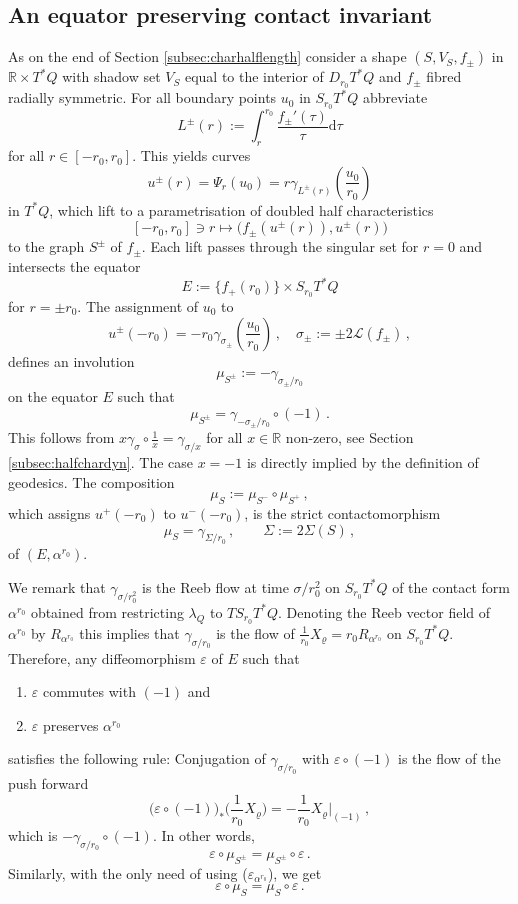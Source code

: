 \documentclass{amsart}
\theoremstyle{definition}
\newcommand{\rmd}{\mathrm d}
\newcommand{\LLL}{\mathscr L}
\newcommand{\R}{\mathbb R}
\begin{document}

\subsection{An equator preserving contact invariant\label{subsec:equatorpresvinv}}



As on the end of Section \ref{subsec:charhalflength}
consider a shape $(S,V_S,f_{\pm})$ in $\R\times T^*Q$
with shadow set $V_S$
equal to the interior of $D_{r_0}T^*Q$
and $f_{\pm}$ fibred radially symmetric.
For all boundary points $u_0$ in $S_{r_0}T^*Q$
abbreviate
\[
L^{\pm}(r):=
\int_r^{r_0}
          \frac{f_{\pm}'(\tau)}{\tau}
\rmd\tau
\]
for all $r\in[-r_0,r_0]$.
This yields curves
\[
u^{\pm}(r)=
\Psi_r(u_0)=
r\gamma_{L^{\pm}(r)}
\left(\frac{u_0}{r_0}\right)
\]
in $T^*Q$,
which lift to a parametrisation of
doubled half characteristics
\[
[-r_0,r_0]\ni r\longmapsto
\big(f_{\pm}(u^{\pm}(r)),u^{\pm}(r)\big)
\]
to the graph $S^{\pm}$ of $f_{\pm}$.
Each lift passes through the singular set for $r=0$
and intersects the equator
\[
E:=\{f_+(r_0)\}\times S_{r_0}T^*Q
\]
for $r=\pm r_0$.
The assignment of $u_0$ to
\[
u^{\pm}(-r_0)=
-r_0\gamma_{\sigma_{\pm}}
\!\left(\frac{u_0}{r_0}\right)
\,,
\quad
\sigma_{\pm}:={\pm}2\LLL(f_{\pm})
\,,
\]
defines an involution
\[
\mu_{S^{\pm}}:=
-\gamma_{\sigma_{\pm}/r_0}
\]
on the equator $E$ such that
\[
\mu_{S^{\pm}}=
\gamma_{-\sigma_{\pm}/r_0}\circ (-1)
\,.
\]
This follows from
$x\gamma_{\sigma}\circ\frac1x=\gamma_{\sigma/x}$
for all $x\in\R$ non-zero,
see Section \ref{subsec:halfchardyn}.
The case $x=-1$ is directly implied by the definition of geodesics.
The composition
\[
\mu_S:=\mu_{S^-}\circ\mu_{S^+}
\,,
\]
which assigns $u^+(-r_0)$ to $u^-(-r_0)$,
is the strict contactomorphism
\[
\mu_S=\gamma_{\Sigma/r_0}
\,,
\qquad
\Sigma:=2\Sigma(S)
\,,
\]
of $(E,\alpha^{r_0})$.

We remark that
$\gamma_{\sigma/r_0^2}$ is the Reeb flow
at time $\sigma/r_0^2$
on $S_{r_0}T^*Q$ of the contact form $\alpha^{r_0}$
obtained from restricting $\lambda_Q$
to $TS_{r_0}T^*Q$.
Denoting the Reeb vector field of $\alpha^{r_0}$
by $R_{\alpha^{r_0}}$ this implies that
$\gamma_{\sigma/r_0}$ is the flow of
$\frac{1}{r_0}X_{\varrho}=r_0R_{\alpha^{r_0}}$
on $S_{r_0}T^*Q$.
Therefore,
any diffeomorphism $\varepsilon$ of $E$
such that
  	\begin{enumerate}
 	\item[($\varepsilon_{-1}$)]
	$\varepsilon$ commutes with $(-1)$ and
 	\item[($\varepsilon_{\alpha^{r_0}}$)]
	$\varepsilon$ preserves $\alpha^{r_0}$
	\end{enumerate}
satisfies the following rule:
Conjugation of $\gamma_{\sigma/r_0}$ with
$\varepsilon\circ (-1)$ is the flow of the push forward
\[
\big(\varepsilon\circ (-1)\big)_*
\Big(\frac{1}{r_0}X_{\varrho}\Big)
=-\frac{1}{r_0}X_{\varrho}|_{(-1)}
\,,
\]
which is $-\gamma_{\sigma/r_0}\circ (-1)$.
In other words,
\[
\varepsilon\circ\mu_{S^{\pm}}=
\mu_{S^{\pm}}\circ\varepsilon
\,.
\]
Similarly,
with the only need of using ($\varepsilon_{\alpha^{r_0}}$),
we get
\[
\varepsilon\circ\mu_S=
\mu_S\circ\varepsilon
\,.
\]
\end{document}
